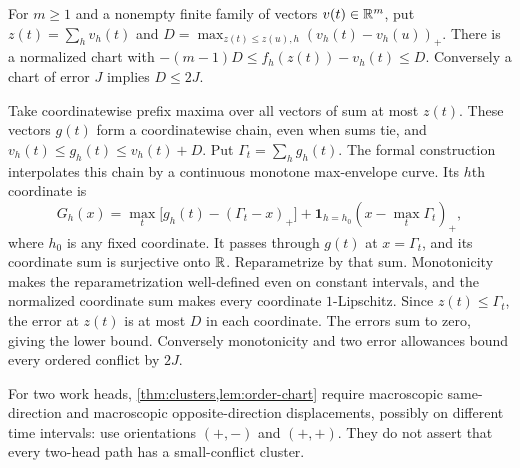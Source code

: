 \begin{lemma}\label{lem:order-chart}
For $m\ge1$ and a nonempty finite family of vectors $v(t)\in\mathbb{R}^m$, put $z(t)=\sum_hv_h(t)$ and
$D=\max_{z(t)\le z(u),h}(v_h(t)-v_h(u))_+$. There is a normalized chart
with $-(m-1)D\le f_h(z(t))-v_h(t)\le D$. Conversely a chart of error $J$
implies $D\le2J$.
\end{lemma}
\begin{outline}
Take coordinatewise prefix maxima over all vectors of sum at most $z(t)$.
These vectors $g(t)$ form a coordinatewise chain, even when sums tie, and
$v_h(t)\le g_h(t)\le v_h(t)+D$. Put $\Gamma_t=\sum_hg_h(t)$.
The formal construction interpolates this chain by a continuous monotone
max-envelope curve. Its $h$th coordinate is
\[
 G_h(x)=\max_t\bigl[g_h(t)-(\Gamma_t-x)_+\bigr]
       +\mathbf 1_{h=h_0}(x-\max_t\Gamma_t)_+,
\]
where $h_0$ is any fixed coordinate. It passes through $g(t)$ at
$x=\Gamma_t$, and its coordinate sum is surjective onto $\mathbb{R}$.
Reparametrize by that sum. Monotonicity makes the reparametrization
well-defined even on constant intervals, and the normalized coordinate sum
makes every coordinate $1$-Lipschitz. Since $z(t)\le\Gamma_t$, the error at
$z(t)$ is at most $D$ in each coordinate. The errors sum to zero, giving the
lower bound. Conversely monotonicity and two error allowances bound every
ordered conflict by $2J$.
\end{outline}
For two work heads, \cref{thm:clusters,lem:order-chart} require macroscopic
same-direction and macroscopic opposite-direction displacements, possibly
on different time intervals: use orientations $(+,-)$ and $(+,+)$. They do
not assert that every two-head path has a small-conflict cluster.
